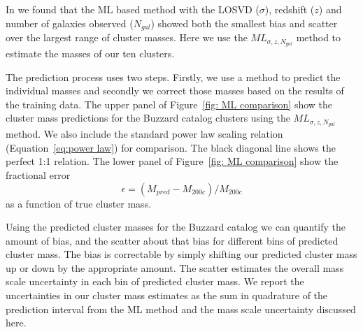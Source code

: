 In  we found that the ML based method with the LOSVD ($\sigma$), redshift ($z$) and number of galaxies observed ($N_{gal}$) showed both the smallest bias and scatter over the largest range of cluster masses. Here we use the $ML_{\sigma, z, N_{gal}}$ method to estimate the masses of our ten clusters. 

The prediction process uses two steps. Firstly, we use a method to predict the individual masses and secondly we correct those masses based on the results of the training data. The upper panel of Figure~\ref{fig: ML comparison} show the cluster mass predictions for the Buzzard catalog clusters using the $ML_{\sigma, z, N_{gal}}$ method. We also include the standard power law scaling relation (Equation~\ref{eq:power law}) for comparison. The black diagonal line shows the perfect 1:1 relation. The lower panel of Figure~\ref{fig: ML comparison} show the fractional error 
\begin{equation}\label{eq: fractional error}
	\epsilon = (M_{pred} - M_{200c})/M_{200c}
\end{equation}
as a function of true cluster mass.

Using the predicted cluster masses for the Buzzard catalog we can quantify the amount of bias, and the scatter about that bias for different bins of predicted cluster mass. The bias is correctable by simply shifting our predicted cluster mass up or down by the appropriate amount. The scatter estimates the overall mass scale uncertainty in each bin of predicted cluster mass. We report the uncertainties in our cluster mass estimates as the sum in quadrature of the prediction interval from the ML method and the mass scale uncertainty discussed here.


